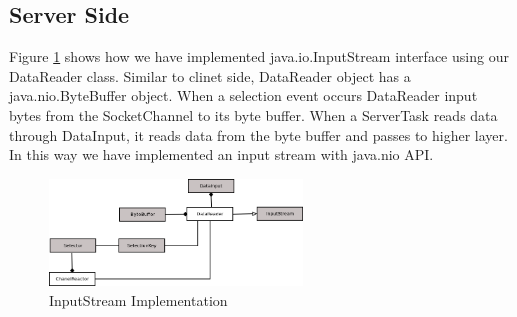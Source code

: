 \subsection{Server Side}
Figure \ref{server} shows how we have implemented java.io.InputStream interface using our DataReader class. Similar to clinet side, DataReader object has a java.nio.ByteBuffer object. When a selection event occurs DataReader input bytes from the SocketChannel to its byte buffer. When a ServerTask reads data through DataInput, it reads data from the byte buffer and passes to higher layer. In this way we have implemented an input stream with java.nio API.
\begin{figure}
        \centering
        \includegraphics[width=0.6\textwidth]{server.png}
        \caption{InputStream Implementation}
        \label{server}
\end{figure}